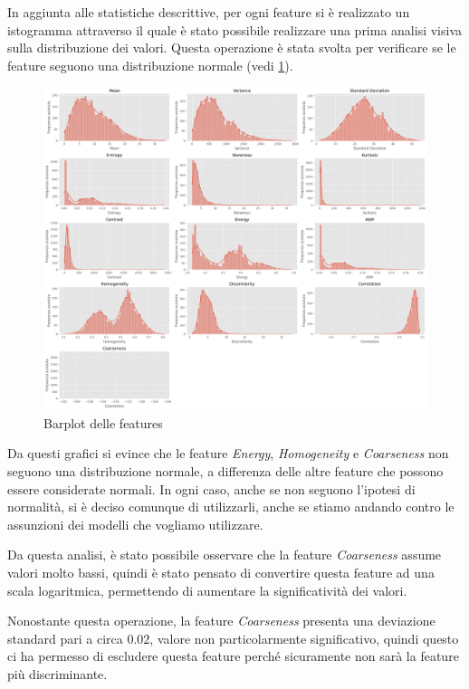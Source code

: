 In aggiunta alle statistiche descrittive, per ogni feature si è realizzato un
istogramma attraverso il quale è stato possibile realizzare una prima analisi
visiva sulla distribuzione dei valori. Questa operazione è stata svolta per
verificare se le feature seguono una distribuzione normale (vedi \ref{fig:barplot_features}).
\begin{figure}
      \centering
      \includegraphics[width=\textwidth]{img/analisi/barplot.png}
      \caption{Barplot delle features}
      \label{fig:barplot_features}
\end{figure}

Da questi grafici si evince che le feature \textit{Energy}, \textit{Homogeneity}
e \textit{Coarseness} non seguono una distribuzione normale, a differenza delle
altre feature che possono essere considerate normali. In ogni caso, anche se non
seguono l'ipotesi di normalità, si è deciso comunque di utilizzarli, anche se
stiamo andando contro le assunzioni dei modelli che vogliamo utilizzare. %

Da questa analisi, è stato possibile osservare che la feature \textit{Coarseness}
assume valori molto bassi, quindi è stato pensato di convertire questa feature
ad una scala logaritmica, permettendo di aumentare la significatività dei valori.

Nonostante questa operazione, la feature \textit{Coarseness} presenta una deviazione
standard pari a circa $0.02$, valore non particolarmente significativo, quindi
questo ci ha permesso di escludere questa feature perché sicuramente non sarà la
feature più discriminante.

